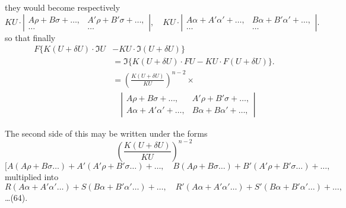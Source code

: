 \documentclass[11pt,a4paper]{book}
\begin{document}
\newpage
they would become respectively
\[
KU \cdot \left|\begin{array}{cc}
A\rho + B\sigma + \ldots, & A'\rho + B'\sigma + \ldots, \\
\ldots & \ldots
\end{array}\right|, \quad
KU \cdot \left|\begin{array}{cc}
A\alpha + A'\alpha' + \ldots, & B\alpha + B'\alpha' + \ldots, \\
\ldots & \ldots
\end{array}\right|
\tag{62}.
\]
so that finally
\begin{align*}
F\{K(U+\delta U) \cdot \mathfrak{I}U &- KU \cdot \mathfrak{I}(U+\delta U)\} \\
&= \mathfrak{I}\{K(U+\delta U) \cdot FU - KU \cdot F(U+\delta U)\} \tag{63}.\\
&= \left(\frac{K(U+\delta U)}{KU}\right)^{n-2} \times \\
&\quad \left|\begin{array}{cc}
A\rho + B\sigma + \ldots, & A'\rho + B'\sigma + \ldots, \\
A\alpha + A'\alpha' + \ldots, & B\alpha + B\alpha' + \ldots,
\end{array}\right|
\end{align*}

The second side of this may be written under the forms
\[
\left(\frac{K(U+\delta U)}{KU}\right)^{n-2}
\]
\[
[A(A\rho + B\sigma \ldots) + A'(A'\rho + B'\sigma \ldots) + \ldots, \quad
B(A\rho + B\sigma \ldots) + B'(A'\rho + B'\sigma \ldots) + \ldots,
\]
multiplied into
\[
R(A\alpha + A'\alpha' \ldots) + S(B\alpha + B'\alpha' \ldots) + \ldots, \quad
R'(A\alpha + A'\alpha' \ldots) + S'(B\alpha + B'\alpha' \ldots) + \ldots,
\]
\ldots (64).
\end{document}
